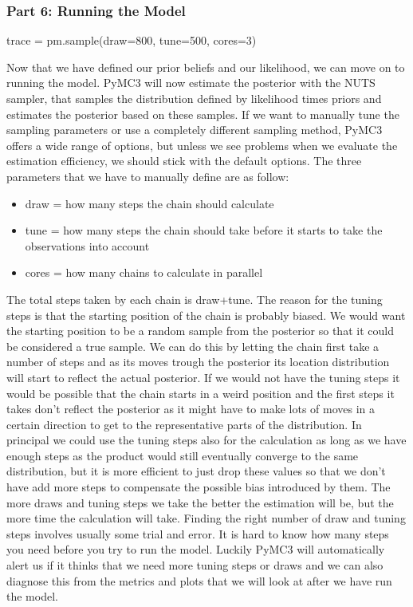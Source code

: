 \documentclass[12pt,a4paper,leqno]{report}
\theoremstyle{plain}
\theoremstyle{definition}
\theoremstyle{remark}
\begin{document}
\subsubsection*{Part 6: Running the Model}

\bigskip
\begin{pyverbatim}[][fontsize=\footnotesize]
    trace = pm.sample(draw=800, tune=500, cores=3)
\end{pyverbatim}
\smallskip

Now that we have defined our prior beliefs and our likelihood, we can move on to running the
model. PyMC3 will now estimate the posterior with the NUTS sampler,
that samples the distribution defined by likelihood times priors and estimates the
posterior based on these samples. If we want to manually tune the sampling parameters or
use a completely different sampling method, PyMC3 offers a wide range of options, but
unless we see problems when we evaluate the estimation efficiency,
we should stick with the default options. The three parameters that we have to manually define are as follow:

\begin{itemize}
    \item[] draw = how many steps the chain should calculate
    \item[] tune = how many steps the chain should take before it starts to
    take the observations into account
    \item[] cores = how many chains to calculate in parallel
\end{itemize}

The total steps taken by each chain is draw+tune. The reason for the tuning steps is
that the starting position of the chain is probably biased. We would want the starting
position to be a random sample from the posterior so that it could be considered a true
sample. We can do this by letting the chain first take
a number of steps and as its moves trough the posterior its location distribution will start to
reflect the actual posterior. If we would not have the tuning steps it would be possible
that the chain starts in a weird position and the first steps it takes don't reflect the
posterior as it might have to make lots of moves in a certain direction to get to the
representative parts of the distribution. In principal we could use the tuning steps
also for the calculation as long as we have enough steps as the product would
still eventually converge to the same distribution, but it is more efficient to just drop these
values so that we don't have add more steps to compensate the possible bias introduced by
them. The more draws and tuning steps we take the better the estimation will be, but the
more time the calculation will take. Finding the
right number of draw and tuning steps involves usually some trial and error. It is
hard to know how many steps you need before you try to run the model. Luckily PyMC3 will
automatically alert us if it thinks that we need more tuning steps or draws and we can
also diagnose this from the metrics and plots that we will look at after we have run the
model.
\end{document}
